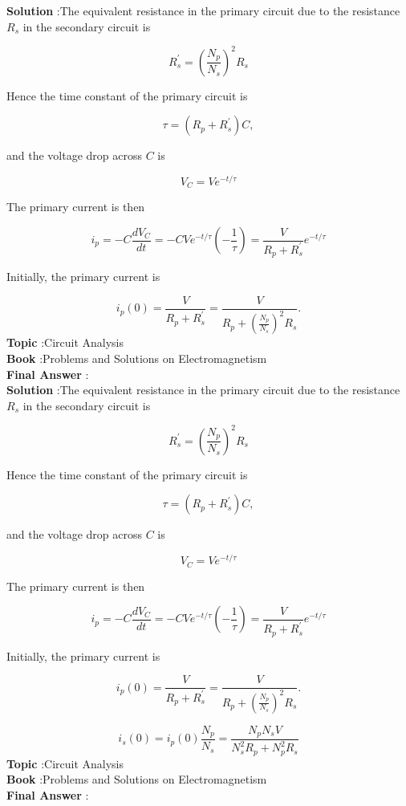 \documentclass[10pt]{article}
\begin{document}
\textbf{Solution} :The equivalent resistance in the primary circuit due to the resistance $R_{s}$ in the secondary circuit is

$$
R_{s}^{\prime}=\left(\frac{N_{p}}{N_{s}}\right)^{2} R_{s}
$$

Hence the time constant of the primary circuit is

$$
\tau=\left(R_{p}+R_{s}^{\prime}\right) C,
$$

and the voltage drop across $C$ is

$$
V_{C}=V e^{-t / \tau}
$$

The primary current is then

$$
i_{p}=-C \frac{d V_{C}}{d t}=-C V e^{-t / \tau}\left(-\frac{1}{\tau}\right)=\frac{V}{R_{p}+R_{s}^{\prime}} e^{-t / \tau}
$$

Initially, the primary current is

$$
i_{p}(0)=\frac{V}{R_{p}+R_{s}^{\prime}}=\frac{V}{R_{p}+\left(\frac{N_{p}}{N_{s}}\right)^{2} R_{s}} .
$$
\textbf{Topic} :Circuit Analysis\\
\textbf{Book} :Problems and Solutions on Electromagnetism\\
\textbf{Final Answer} :\\


\textbf{Solution} :The equivalent resistance in the primary circuit due to the resistance $R_{s}$ in the secondary circuit is

$$
R_{s}^{\prime}=\left(\frac{N_{p}}{N_{s}}\right)^{2} R_{s}
$$

Hence the time constant of the primary circuit is

$$
\tau=\left(R_{p}+R_{s}^{\prime}\right) C,
$$

and the voltage drop across $C$ is

$$
V_{C}=V e^{-t / \tau}
$$

The primary current is then

$$
i_{p}=-C \frac{d V_{C}}{d t}=-C V e^{-t / \tau}\left(-\frac{1}{\tau}\right)=\frac{V}{R_{p}+R_{s}^{\prime}} e^{-t / \tau}
$$

Initially, the primary current is

$$
i_{p}(0)=\frac{V}{R_{p}+R_{s}^{\prime}}=\frac{V}{R_{p}+\left(\frac{N_{p}}{N_{s}}\right)^{2} R_{s}} .
$$



$$
i_{s}(0)=i_{p}(0) \frac{N_{p}}{N_{s}}=\frac{N_{p} N_{s} V}{N_{s}^{2} R_{p}+N_{p}^{2} R_{s}}
$$
\textbf{Topic} :Circuit Analysis\\
\textbf{Book} :Problems and Solutions on Electromagnetism\\
\textbf{Final Answer} :\\
\end{document}
